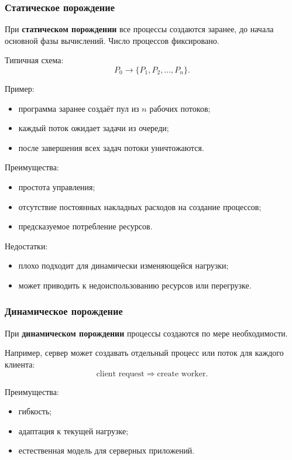 \documentclass[12pt,a4paper]{article}
\begin{document}
\subsubsection{Статическое порождение}

При \textbf{статическом порождении} все процессы создаются заранее, до начала основной фазы вычислений. Число процессов фиксировано.

Типичная схема:
\[
P_0 \rightarrow \{P_1, P_2, \ldots, P_n\}.
\]

Пример:
\begin{itemize}
    \item программа заранее создаёт пул из $n$ рабочих потоков;
    \item каждый поток ожидает задачи из очереди;
    \item после завершения всех задач потоки уничтожаются.
\end{itemize}

Преимущества:
\begin{itemize}
    \item простота управления;
    \item отсутствие постоянных накладных расходов на создание процессов;
    \item предсказуемое потребление ресурсов.
\end{itemize}

Недостатки:
\begin{itemize}
    \item плохо подходит для динамически изменяющейся нагрузки;
    \item может приводить к недоиспользованию ресурсов или перегрузке.
\end{itemize}

\subsubsection{Динамическое порождение}

При \textbf{динамическом порождении} процессы создаются по мере необходимости.

Например, сервер может создавать отдельный процесс или поток для каждого клиента:
\[
\text{client request} \Rightarrow \text{create worker}.
\]

Преимущества:
\begin{itemize}
    \item гибкость;
    \item адаптация к текущей нагрузке;
    \item естественная модель для серверных приложений.
\end{itemize}
\end{document}

